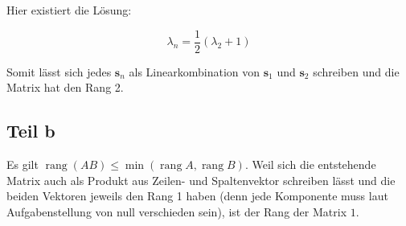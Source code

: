 \documentclass[a4paper,german,12pt,smallheadings]{scrartcl}
\begin{document}
Hier existiert die Lösung:

\begin{equation*}
  \lambda_n = \frac{1}{2} (\lambda_2+1)
\end{equation*}

Somit lässt sich jedes $\mathbf{s}_n$ als Linearkombination von $\mathbf{s}_1$
und $\mathbf{s}_2$ schreiben und die Matrix hat den Rang 2.

\subsection*{Teil b}

Es gilt $\operatorname{rang}(AB) \leq \operatorname{min}(\operatorname{rang} A,
\operatorname{rang} B)$. Weil sich die entstehende Matrix auch als Produkt aus
Zeilen- und Spaltenvektor schreiben lässt und die beiden Vektoren jeweils den
Rang 1 haben (denn jede Komponente muss laut Aufgabenstellung von null
verschieden sein), ist der Rang der Matrix $1$.
\end{document}
